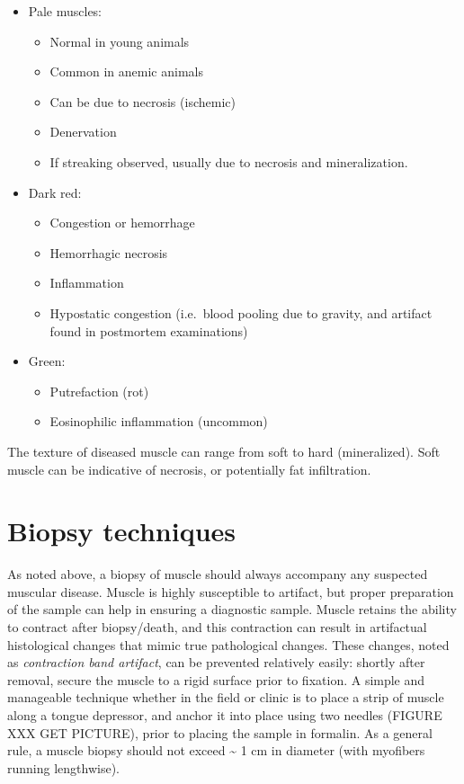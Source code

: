 \documentclass[openany]{book}
\providecommand{\tightlist}{%
  \setlength{\itemsep}{0pt}\setlength{\parskip}{0pt}}
\begin{document}
\begin{itemize}
\tightlist
\item
  Pale muscles:

  \begin{itemize}
  \tightlist
  \item
    Normal in young animals
  \item
    Common in anemic animals
  \item
    Can be due to necrosis (ischemic)
  \item
    Denervation
  \item
    If streaking observed, usually due to necrosis and mineralization.
  \end{itemize}
\item
  Dark red:

  \begin{itemize}
  \tightlist
  \item
    Congestion or hemorrhage
  \item
    Hemorrhagic necrosis
  \item
    Inflammation
  \item
    Hypostatic congestion (i.e.~blood pooling due to gravity, and
    artifact found in postmortem examinations)
  \end{itemize}
\item
  Green:

  \begin{itemize}
  \tightlist
  \item
    Putrefaction (rot)
  \item
    Eosinophilic inflammation (uncommon)
  \end{itemize}
\end{itemize}

The texture of diseased muscle can range from soft to hard
(mineralized). Soft muscle can be indicative of necrosis, or potentially
fat infiltration.

\section{Biopsy techniques}\label{biopsy-techniques}

As noted above, a biopsy of muscle should always accompany any suspected
muscular disease. Muscle is highly susceptible to artifact, but proper
preparation of the sample can help in ensuring a diagnostic sample.
Muscle retains the ability to contract after biopsy/death, and this
contraction can result in artifactual histological changes that mimic
true pathological changes. These changes, noted as \emph{contraction
band artifact}, can be prevented relatively easily: shortly after
removal, secure the muscle to a rigid surface prior to fixation. A
simple and manageable technique whether in the field or clinic is to
place a strip of muscle along a tongue depressor, and anchor it into
place using two needles (FIGURE XXX GET PICTURE), prior to placing the
sample in formalin. As a general rule, a muscle biopsy should not exceed
\textasciitilde{} 1 cm in diameter (with myofibers running lengthwise).
\end{document}
